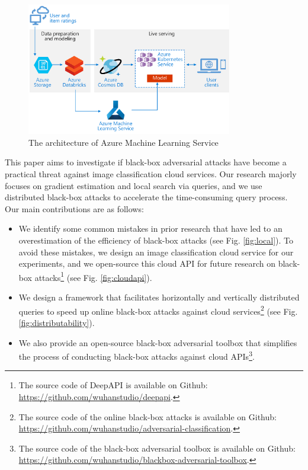 \begin{figure}[H]
\centering
\includegraphics[width=0.8\textwidth]{figures/chapter_classification/azure_ml.png}
\caption{The architecture of Azure Machine Learning Service}
\label{fig.azure_ml}
\end{figure}

This paper aims to investigate if black-box adversarial attacks have become a practical threat against image classification cloud services. Our research majorly focuses on gradient estimation and local search via queries, and we use distributed black-box attacks to accelerate the time-consuming query process. Our main contributions are as follows: 

\begin{itemize}
    \item We identify some common mistakes in prior research that have led to an overestimation of the efficiency of black-box attacks (see Fig. \ref{fig:local}). To avoid these mistakes, we design an image classification cloud service for our experiments, and we open-source this cloud API for future research on black-box attacks\footnote{The source code of 
    DeepAPI is available on Github: \url{https://github.com/wuhanstudio/deepapi}.} (see Fig. \ref{fig:cloudapi}).
    \item We design a framework that facilitates horizontally and vertically distributed queries to speed up online black-box attacks against cloud services\footnote{The source code of the online black-box attacks is available on Github: \url{https://github.com/wuhanstudio/adversarial-classification}.} (see Fig. \ref{fig:distributability}). 
    \item We also provide an open-source black-box adversarial toolbox that simplifies the process of conducting black-box attacks against cloud APIs\footnote{The source code of the black-box adversarial toolbox is available on Github: \url{https://github.com/wuhanstudio/blackbox-adversarial-toolbox}.}. 
\end{itemize}

